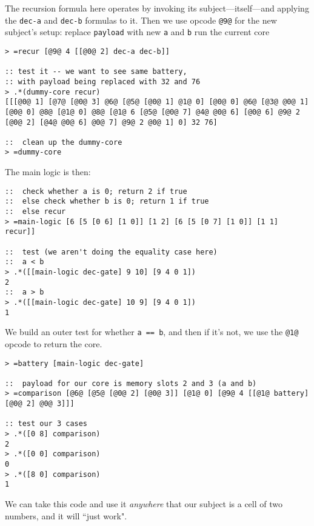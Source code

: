 \documentclass[twoside]{article}
\begin{document}
The recursion formula here operates by invoking its subject—itself—and applying the \lstinline[style=inlinecode]{dec-a} and \lstinline[style=inlinecode]{dec-b} formulas to it.  Then we use opcode \lstinline[style=inlinecode]{@9@} for the new subject's setup: replace \lstinline[style=inlinecode]{payload} with new \lstinline[style=inlinecode]{a} and \lstinline[style=inlinecode]{b} run the current core

\begin{lstlisting}[style=listingcode]
> =recur [@9@ 4 [[@0@ 2] dec-a dec-b]]

:: test it -- we want to see same battery,
:: with payload being replaced with 32 and 76
> .*(dummy-core recur)
[[[@0@ 1] [@7@ [@0@ 3] @6@ [@5@ [@0@ 1] @1@ 0] [@0@ 0] @6@ [@3@ @0@ 1] [@0@ 0] @8@ [@1@ 0] @8@ [@1@ 6 [@5@ [@0@ 7] @4@ @0@ 6] [@0@ 6] @9@ 2 [@0@ 2] [@4@ @0@ 6] @0@ 7] @9@ 2 @0@ 1] 0] 32 76]

::  clean up the dummy-core
> =dummy-core
\end{lstlisting}

The main logic is then:

\begin{lstlisting}[style=listingcode]
::  check whether a is 0; return 2 if true
::  else check whether b is 0; return 1 if true
::  else recur
> =main-logic [6 [5 [0 6] [1 0]] [1 2] [6 [5 [0 7] [1 0]] [1 1] recur]]

::  test (we aren't doing the equality case here)
::  a < b
> .*([[main-logic dec-gate] 9 10] [9 4 0 1])
2
::  a > b
> .*([[main-logic dec-gate] 10 9] [9 4 0 1])
1
\end{lstlisting}


We build an outer test for whether \lstinline[style=inlinecode]{a == b}, and then if it's not, we use the \lstinline[style=inlinecode]{@1@} opcode to return the core.

\begin{lstlisting}[style=listingcode]
> =battery [main-logic dec-gate]

::  payload for our core is memory slots 2 and 3 (a and b)
> =comparison [@6@ [@5@ [@0@ 2] [@0@ 3]] [@1@ 0] [@9@ 4 [[@1@ battery] [@0@ 2] @0@ 3]]]

:: test our 3 cases
> .*([0 8] comparison)
2
> .*([0 0] comparison)
0
> .*([8 0] comparison)
1
\end{lstlisting}

We can take this code and use it \emph{anywhere} that our subject is a cell of two numbers, and it will ``just work".
\end{document}
